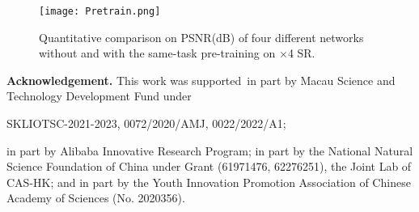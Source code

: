 \documentclass[10pt,twocolumn,letterpaper]{article}
\begin{document}
\begin{table}[!t]
\center
\begin{center}
\caption{Quantitative results on PSNR(dB) of HAT using two kinds of pre-training strategies on $\times$4 SR under the same training setting. The full ImageNet dataset is adopted to perform pre-training and DF2K dataset is used for fine-tuning.}
\vspace{-0.2cm}
\label{pretrain1}
\end{center}
\end{table}

\begin{figure}[!t]
\begin{center}
\texttt{[image: Pretrain.png]}
\end{center}
\vspace{-0.4cm}
\caption{Quantitative comparison on PSNR(dB) of four different networks without and with the same-task pre-training on $\times$4 SR.}
\label{pretrain2}
\vspace{-0.5cm}
\end{figure}

\noindent\textbf{Acknowledgement.} This work was supported in part by Macau Science and Technology Development Fund under 

\noindent SKLIOTSC-2021-2023, 0072/2020/AMJ, 0022/2022/A1; 

\noindent in part by Alibaba Innovative Research Program; in part by the National Natural Science Foundation of China under Grant (61971476, 62276251), the Joint Lab of CAS-HK; and in part by the Youth Innovation Promotion Association of Chinese Academy of Sciences (No. 2020356).

{\small


}

\newpage
\clearpage
\appendix
\end{document}
